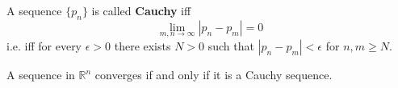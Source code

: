 \documentclass[10pt,a4paper,UTF8]{article}
\begin{document}
\begin{definition}
A sequence \(\{p_n\}\) is called \textbf{Cauchy} iff
\begin{equation*}
  \lim_{m,n\to\infty} |p_n-p_m|=0
\end{equation*}
i.e. iff for every \(\epsilon > 0\) there exists \(N > 0\) such that
\(|p_n-p_m| < \epsilon\) for \(n,m\ge N\).
\end{definition}

\begin{theorem}
A sequence in \(\mathbb{R}^n\) converges if  and only if it is a Cauchy sequence.
\end{theorem}
\end{document}
